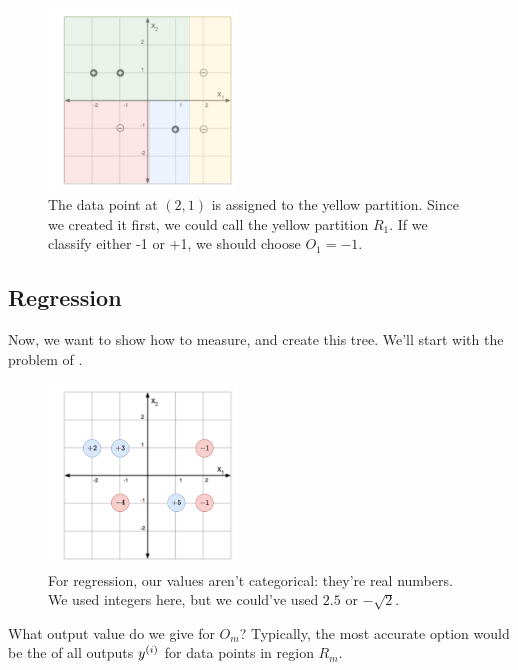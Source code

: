         \begin{figure}[H]
            \centering
            \includegraphics[width=50mm,scale=0.5]{images/nonparametric_images/full_tree.png}
            \caption*{The data point at $(2,1)$ is assigned to the yellow partition. Since we created it first, we could call the yellow partition $R_1$. If we classify either -1 or +1, we should choose $O_1=-1$.}
        \end{figure}


    \pagebreak

    \subsection{Regression}

        Now, we want to show how to measure, and create this tree. We'll start with the problem of .

        \begin{figure}[H]
            \centering
            \includegraphics[width=50mm,scale=0.5]{images/nonparametric_images/regression_example.png}
            \caption*{For regression, our values aren't categorical: they're real numbers. We used integers here, but we could've used $2.5$ or $-\sqrt{2}$.}
        \end{figure}


        What output value do we give for $O_m$? Typically, the most accurate option would be the  of all outputs $y^{(i)}$ for data points in region $R_m$.

        

